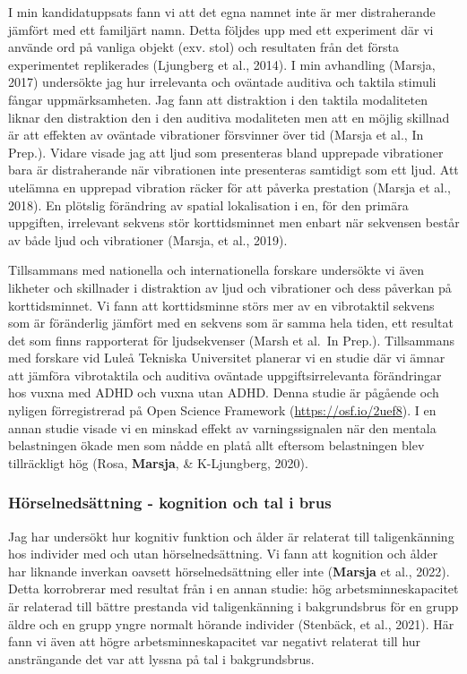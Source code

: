 \documentclass[]{article}
\begin{document}
I min kandidatuppsats fann vi att det egna namnet inte är mer
distraherande jämfört med ett familjärt namn. Detta följdes upp med ett
experiment där vi använde ord på vanliga objekt (exv. stol) och
resultaten från det första experimentet replikerades (Ljungberg et al.,
2014). I min avhandling (Marsja, 2017) undersökte jag hur irrelevanta
och oväntade auditiva och taktila stimuli fångar uppmärksamheten. Jag
fann att distraktion i den taktila modaliteten liknar den distraktion
den i den auditiva modaliteten men att en möjlig skillnad är att
effekten av oväntade vibrationer försvinner över tid (Marsja et al., In
Prep.). Vidare visade jag att ljud som presenteras bland upprepade
vibrationer bara är distraherande när vibrationen inte presenteras
samtidigt som ett ljud. Att utelämna en upprepad vibration räcker för
att påverka prestation (Marsja et al., 2018). En plötslig förändring av
spatial lokalisation i en, för den primära uppgiften, irrelevant sekvens
stör korttidsminnet men enbart när sekvensen består av både ljud och
vibrationer (Marsja, et al., 2019).

Tillsammans med nationella och internationella forskare undersökte vi
även likheter och skillnader i distraktion av ljud och vibrationer och
dess påverkan på korttidsminnet. Vi fann att korttidsminne störs mer av
en vibrotaktil sekvens som är föränderlig jämfört med en sekvens som är
samma hela tiden, ett resultat det som finns rapporterat för
ljudsekvenser (Marsh et al.~In Prep.). Tillsammans med forskare vid
Luleå Tekniska Universitet planerar vi en studie där vi ämnar att
jämföra vibrotaktila och auditiva oväntade uppgiftsirrelevanta
förändringar hos vuxna med ADHD och vuxna utan ADHD. Denna studie är
pågående och nyligen förregistrerad på Open Science Framework
(\url{https://osf.io/2uef8}). I en annan studie visade vi en minskad
effekt av varningssignalen när den mentala belastningen ökade men som
nådde en platå allt eftersom belastningen blev tillräckligt hög (Rosa,
\textbf{Marsja}, \& K-Ljungberg, 2020).

\hypertarget{huxf6rselnedsuxe4ttning---kognition-och-tal-i-brus}{%
\subsubsection{Hörselnedsättning - kognition och tal i
brus}\label{huxf6rselnedsuxe4ttning---kognition-och-tal-i-brus}}

Jag har undersökt hur kognitiv funktion och ålder är relaterat till
taligenkänning hos individer med och utan hörselnedsättning. Vi fann att
kognition och ålder har liknande inverkan oavsett hörselnedsättning
eller inte (\textbf{Marsja} et al., 2022). Detta korrobrerar med
resultat från i en annan studie: hög arbetsminneskapacitet är relaterad
till bättre prestanda vid taligenkänning i bakgrundsbrus för en grupp
äldre och en grupp yngre normalt hörande individer (Stenbäck, et al.,
2021). Här fann vi även att högre arbetsminneskapacitet var negativt
relaterat till hur ansträngande det var att lyssna på tal i
bakgrundsbrus.
\end{document}
